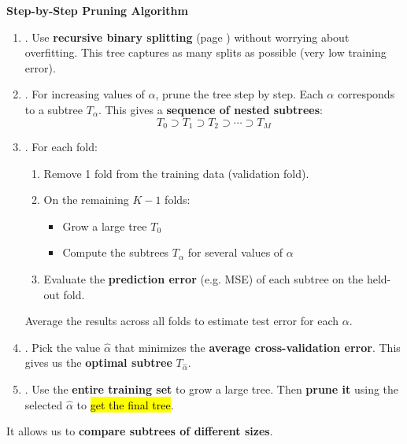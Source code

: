 \highspace
\begin{flushleft}
    \textcolor{Green3}{ \textbf{Step-by-Step Pruning Algorithm}}
\end{flushleft}
\begin{enumerate}
    \item {}. Use \textbf{recursive binary splitting} (page \pageref{subsubsection: Recursive Binary Splitting}) without worrying about overfitting. This tree captures as many splits as possible (very low training error).

    \item {}. For increasing values of $\alpha$, prune the tree step by step. Each $\alpha$ corresponds to a subtree $T_{\alpha}$. This gives a \textbf{sequence of nested subtrees}:
    \begin{equation*}
        T_0 \supset T_1 \supset T_2 \supset \cdots \supset T_M
    \end{equation*}

    \item {}. For each fold:
    \begin{enumerate}
        \item Remove 1 fold from the training data (validation fold).
        \item On the remaining $K-1$ folds:
        \begin{itemize}
            \item Grow a large tree $T_0$
            \item Compute the subtrees $T_{\alpha}$ for several values of $\alpha$
        \end{itemize}
        \item Evaluate the \textbf{prediction error} (e.g. MSE) of each subtree on the held-out fold.
    \end{enumerate}
    Average the results across all folds to estimate test error for each $\alpha$.

    \item {}. Pick the value $\hat{\alpha}$ that minimizes the \textbf{average cross-validation error}. This gives us the \textbf{optimal subtree} $T_{\hat{\alpha}}$.

    \item {}. Use the \textbf{entire training set} to grow a large tree. Then \textbf{prune it} using the selected $\hat{\alpha}$ to \hl{get the final tree}.
\end{enumerate}
It allows us to \textbf{compare subtrees of different sizes}.